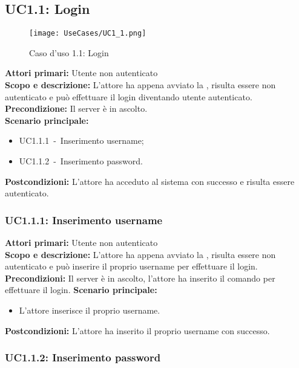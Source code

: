 \documentclass{scalatekids-article}
\begin{document}
\subsection{UC1.1: Login}

\begin{figure}[H]
  \begin{center}
    \texttt{[image: UseCases/UC1\_1.png]}
    \caption{Caso d'uso 1.1: Login}
  \end{center}
\end{figure}
\textbf{Attori primari:} Utente non autenticato\\
\textbf{Scopo e descrizione:}
L’attore ha appena avviato la , risulta essere non autenticato e può effettuare il login diventando utente
autenticato.\\
\textbf{Precondizione:} Il server è in ascolto.\\
\textbf{Scenario principale:}
\begin{itemize}
\item UC1.1.1\ -\ Inserimento username;
\item UC1.1.2\ -\ Inserimento password.
\end{itemize}
\textbf{Postcondizioni:} L'attore ha acceduto al sistema con successo e risulta essere autenticato.

\subsubsection{UC1.1.1: Inserimento username}

\textbf{Attori primari:} Utente non autenticato\\
\textbf{Scopo e descrizione:}
L'attore ha appena avviato la , risulta essere non autenticato e può inserire il proprio username per effettuare il login.\\
\textbf{Precondizioni:} Il server è in ascolto, l'attore ha inserito il comando per effettuare il login.
\textbf{Scenario principale:}
\begin{itemize}
\item L'attore inserisce il proprio username.
\end{itemize}
\textbf{Postcondizioni:} L'attore ha inserito il proprio username con successo.

\subsubsection{UC1.1.2: Inserimento password}
\end{document}
